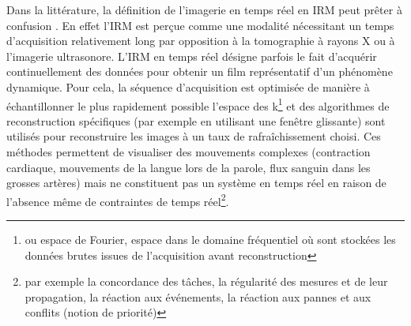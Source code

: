 
Dans la littérature, la définition de l’imagerie en temps réel en \ac{IRM} peut prêter à confusion \cite{dietz2018nomenclature}. En effet l’\ac{IRM} est perçue comme une modalité nécessitant un temps d’acquisition relativement long par opposition à la tomographie à rayons X ou à l’imagerie ultrasonore. L’\ac{IRM} en temps réel désigne parfois le fait d’acquérir continuellement des données pour obtenir un film représentatif d’un phénomène dynamique. Pour cela, la séquence d’acquisition est optimisée de manière à échantillonner le plus rapidement possible l’espace des k\footnote{ou espace de Fourier, espace dans le domaine fréquentiel où sont stockées les données brutes issues de l’acquisition avant reconstruction} et des algorithmes de reconstruction spécifiques (par exemple en utilisant une fenêtre glissante) sont utilisés pour reconstruire les images à un taux de rafraîchissement choisi. Ces méthodes permettent de visualiser des mouvements complexes (contraction cardiaque, mouvements de la langue lors de la parole, flux sanguin dans les grosses artères) mais ne constituent pas un système en temps réel en raison de l’absence même de contraintes de temps réel\footnote{par exemple la concordance des tâches, la régularité des mesures et de leur propagation, la réaction aux événements, la réaction aux pannes et aux conflits (notion de priorité)}.\\
